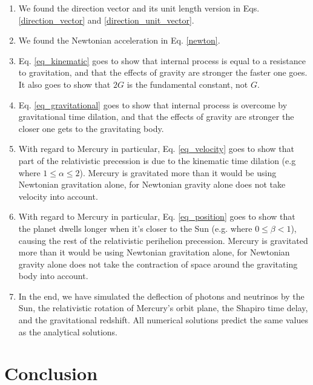 \documentclass[12pt]{article}
\begin{document}
\begin{enumerate}
\item
We found the direction vector and its unit length version in Eqs. \ref{direction_vector} and \ref{direction_unit_vector}.

\item
We found the Newtonian acceleration in Eq. \ref{newton}.

\item
Eq. \ref{eq_kinematic} goes to show that internal process is equal to a resistance to gravitation, and that the effects of gravity are stronger the faster one goes.
It also goes to show that $2G$ is the fundamental constant, not $G$.

\item
Eq. \ref{eq_gravitational} goes to show that internal process is overcome by gravitational time dilation, and that the effects of gravity are stronger the closer one gets to the gravitating body.

\item
With regard to Mercury in particular, Eq. \ref{eq_velocity} goes to show that part of the relativistic precession is due to the kinematic time dilation (e.g where $1 \leq \alpha \leq 2$). 
Mercury is gravitated more than it would be using Newtonian gravitation alone, for Newtonian gravity alone does not take velocity into account.

\item
With regard to Mercury in particular, Eq. \ref{eq_position} goes to show that the planet dwells longer when it's closer to the Sun (e.g. where $0 \leq \beta < 1$), causing the rest of the relativistic perihelion precession. 
Mercury is gravitated more than it would be using Newtonian gravitation alone, for Newtonian gravity alone does not take the contraction of space around the gravitating body into account.

\item
In the end, we have simulated the deflection of photons and neutrinos by the Sun, the relativistic rotation of Mercury's orbit plane, the Shapiro time delay, and the gravitational redshift.
All numerical solutions predict the same values as the analytical solutions.

\end{enumerate}






\section{Conclusion}
\end{document}
